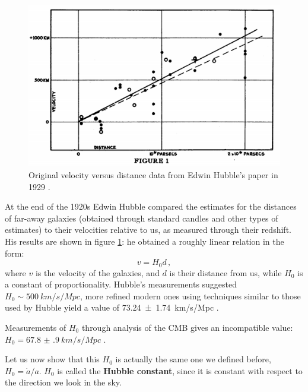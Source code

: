 \documentclass[main.tex]{subfiles}
\begin{document}
\begin{figure}[ht]
\centering
\includegraphics[width=\textwidth]{figures/hubble_original.png}
\caption{Original velocity versus distance data from Edwin Hubble's paper in 1929 \cite{hubbleedwinRelationDistanceRadial1929}.}
\label{fig:hubble_original}
\end{figure}

At the end of the 1920s Edwin Hubble compared the estimates for the distances of far-away galaxies (obtained through standard candles and other types of estimates) to their velocities relative to us, as measured through their redshift. His results are shown in figure \ref{fig:hubble_original}: he obtained a roughly linear relation in the form:
%
\begin{equation}
  v = H_0 d\,,
\end{equation}
%
where \(v\) is the velocity of the galaxies, and \(d\) is their distance from us, while \(H_0 \) is a constant of proportionality.
Hubble's measurements suggested \(H_0 \sim \SI{500}{km/s/Mpc}\), more refined modern ones using techniques similar to those used by Hubble yield a value of \SI{73.24(174)}{km/s/Mpc} \cite{riessDeterminationLocalValue2016}.

Measurements of \(H_0 \) through analysis of the CMB gives an incompatible value: \(H_0 = \SI{67.8(9)}{km/s/Mpc}\) \cite{PlanckCollaboration:2016XIII}.


Let us now show that this \(H_0 \) is actually the same one we defined before, \(H_0 = \dot{a} / a\).
\(H_0 \) is called the \textbf{Hubble constant}, since it is constant with respect to the direction we look in the sky.

\end{document}
